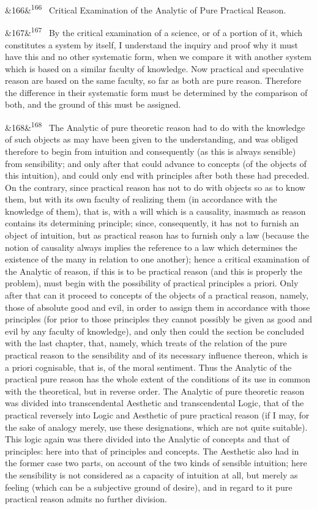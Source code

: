 \documentclass[12pt]{article}
\newcommand{\para}[1][]{\par\noindent\ifx&#1&\else\textsuperscript{\footnotesize #1}~\fi}
\begin{document}
\para[166] Critical Examination of the Analytic of Pure Practical Reason.

\para[167] By the critical examination of a science, or of a portion of it, which constitutes a system by itself, I understand the inquiry and proof why it must have this and no other systematic form, when we compare it with another system which is based on a similar faculty of knowledge. Now practical and speculative reason are based on the same faculty, so far as both are pure reason. Therefore the difference in their systematic form must be determined by the comparison of both, and the ground of this must be assigned.

\para[168] The Analytic of pure theoretic reason had to do with the knowledge of such objects as may have been given to the understanding, and was obliged therefore to begin from intuition and consequently (as this is always sensible) from sensibility; and only after that could advance to concepts (of the objects of this intuition), and could only end with principles after both these had preceded. On the contrary, since practical reason has not to do with objects so as to know them, but with its own faculty of realizing them (in accordance with the knowledge of them), that is, with a will which is a causality, inasmuch as reason contains its determining principle; since, consequently, it has not to furnish an object of intuition, but as practical reason has to furnish only a law (because the notion of causality always implies the reference to a law which determines the existence of the many in relation to one another); hence a critical examination of the Analytic of reason, if this is to be practical reason (and this is properly the problem), must begin with the possibility of practical principles a priori. Only after that can it proceed to concepts of the objects of a practical reason, namely, those of absolute good and evil, in order to assign them in accordance with those principles (for prior to those principles they cannot possibly be given as good and evil by any faculty of knowledge), and only then could the section be concluded with the last chapter, that, namely, which treats of the relation of the pure practical reason to the sensibility and of its necessary influence thereon, which is a priori cognisable, that is, of the moral sentiment. Thus the Analytic of the practical pure reason has the whole extent of the conditions of its use in common with the theoretical, but in reverse order. The Analytic of pure theoretic reason was divided into transcendental Aesthetic and transcendental Logic, that of the practical reversely into Logic and Aesthetic of pure practical reason (if I may, for the sake of analogy merely, use these designations, which are not quite suitable). This logic again was there divided into the Analytic of concepts and that of principles: here into that of principles and concepts. The Aesthetic also had in the former case two parts, on account of the two kinds of sensible intuition; here the sensibility is not considered as a capacity of intuition at all, but merely as feeling (which can be a subjective ground of desire), and in regard to it pure practical reason admits no further division.
\end{document}
